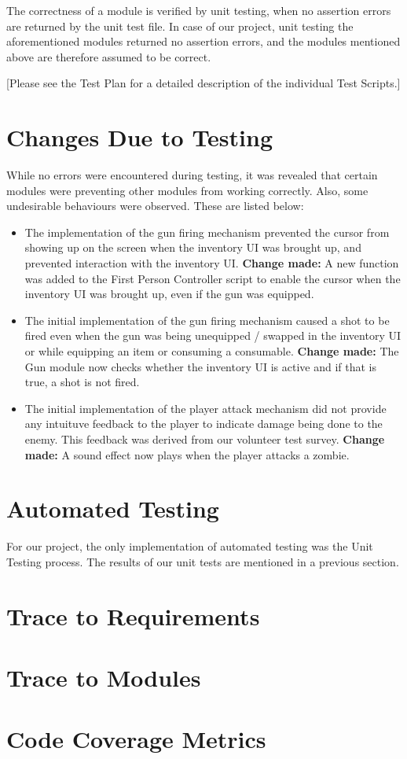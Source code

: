 \documentclass[12pt, titlepage]{article}
\begin{document}
The correctness of a module is verified by unit testing, when no assertion errors are returned by the unit test file. In case of our project, unit testing the aforementioned modules returned no assertion errors, and the modules mentioned above are therefore assumed to be correct.

[Please see the Test Plan for a detailed description of the individual Test Scripts.]
\section{Changes Due to Testing}

While no errors were encountered during testing, it was revealed that certain modules were preventing other modules from working correctly. Also, some undesirable behaviours were observed. These are listed below:

\begin{itemize}
	\item The implementation of the gun firing mechanism prevented the cursor from showing up on the screen when the inventory UI was brought up, and prevented interaction with the inventory UI.\newline
	\textbf{Change made: } A new function was added to the First Person Controller script to enable the cursor when the inventory UI was brought up, even if the gun was equipped.
	\item The initial implementation of the gun firing mechanism caused a shot to be fired even when the gun was being unequipped / swapped in the inventory UI or while equipping an item or consuming a consumable.\newline
	\textbf{Change made: } The Gun module now checks whether the inventory UI is active and if that is true, a shot is not fired.
	\item The initial implementation of the player attack mechanism did not provide any intuituve feedback to the player to indicate damage being done to the enemy. This feedback was derived from our volunteer test survey. \newline
	\textbf{Change made: } A sound effect now plays when the player attacks a zombie.
\end{itemize}
\section{Automated Testing}
		For our project, the only implementation of automated testing was the Unit Testing process. The results of our unit tests are mentioned in a previous section.
\section{Trace to Requirements}
		
\section{Trace to Modules}		

\section{Code Coverage Metrics}




\end{document}
